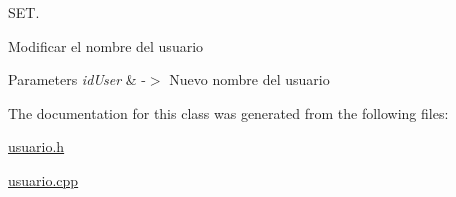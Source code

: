 S\+ET. 

Modificar el nombre del usuario 
\begin{DoxyParams}{Parameters}
{\em id\+User} & -\/$>$ Nuevo nombre del usuario \\
\hline
\end{DoxyParams}


The documentation for this class was generated from the following files\+:\begin{DoxyCompactItemize}
\item 
\mbox{\hyperlink{usuario_8h}{usuario.\+h}}\item 
\mbox{\hyperlink{usuario_8cpp}{usuario.\+cpp}}\end{DoxyCompactItemize}
